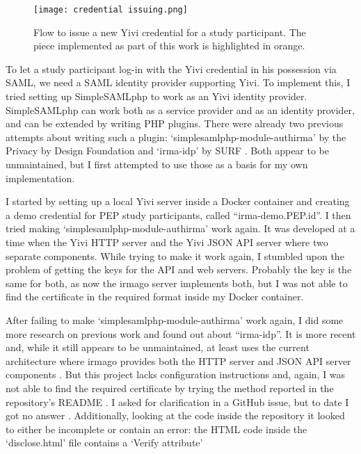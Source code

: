 \documentclass{report}
\begin{document}
\begin{figure}[H]
		\texttt{[image: credential issuing.png]}
		\caption{Flow to issue a new Yivi credential for a study participant. The piece implemented as part of this work is highlighted in orange.}
\end{figure}

To let a study participant log-in with the Yivi credential in his possession via SAML, we need a SAML identity provider supporting Yivi. To implement this, I tried setting up
SimpleSAMLphp \cite{simplesamlphp} to work as an Yivi \cite{about-irma} identity provider. SimpleSAMLphp can work both as a service provider and as an identity provider, and can be
extended by writing PHP plugins. There were already two previous attempts about writing such a plugin: \enquote*{simplesamlphp-module-authirma} \cite{simplesamlphp-module-authirma}
by the Privacy by Design Foundation \cite{privacybydesignfoundation} and \enquote*{irma-idp} \cite{irma-idp} by SURF \cite{surf}.  Both appear to be unmaintained, but I first
attempted to use those as a basis for my own implementation. \par I started by setting up a local Yivi server inside a Docker container and creating a demo credential
\cite{irma-docs-issuer} for PEP study participants, called \enquote{irma-demo.PEP.id}. I then tried making \enquote*{simplesamlphp-module-authirma} work again. It was developed at
a time when the Yivi HTTP server and the Yivi JSON API server where two separate components. While trying to make it work again, I stumbled upon the problem of getting the keys for
the API and web servers. Probably the key is the same for both, as now the irmago server \cite{irma-docs-server} implements both, but I was not able to find the certificate in the
required format inside my Docker container. \par After failing to make \enquote*{simplesamlphp-module-authirma} work again, I did some more research on previous work and found out
about \enquote{irma-idp}. It is more recent and, while it still appears to be unmaintained, at least uses the current architecture where irmago provides both the HTTP server and
JSON API server components \cite{irma-docs-server}. But this project lacks configuration instructions and, again, I was not able to find the required certificate by trying the
method reported in the repository's README \cite{irma-idp}. I asked for clarification in a GitHub issue, but to date I got no answer \cite{irma-idp-issue}. Additionally, looking at
the code inside the repository it looked to either be incomplete or contain an error: the HTML code inside the \enquote*{disclose.html} file contains a \enquote*{Verify attribute}
\end{document}
